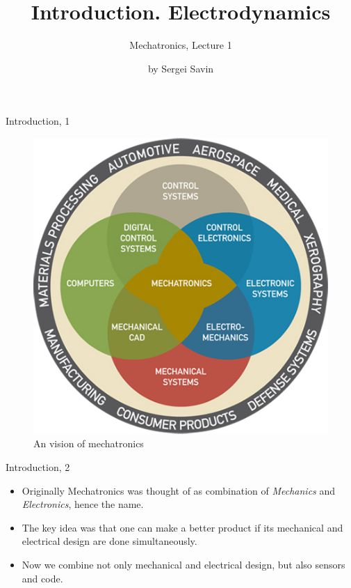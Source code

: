 \documentclass{beamer}
\title{Introduction. Electrodynamics}
\subtitle{Mechatronics, Lecture 1}
\author{by Sergei Savin}
\date{\mydate}
\begin{document}
\maketitle


\begin{frame}{Introduction, 1}
	\begin{flushleft}
		
		\begin{figure}
			\centering
			\includegraphics[width=0.7\linewidth]{mems_deiagram}
			\caption{An vision of mechatronics}
			\label{fig:memsdeiagram}
		\end{figure}
		
		
	\end{flushleft}
\end{frame}



\begin{frame}{Introduction, 2}
	\begin{flushleft}
		
\begin{itemize}
	\item Originally Mechatronics was thought of as combination of \emph{Mechanics} and \emph{Electronics}, hence the name.
	
	\item The key idea was that one can make a better product if its mechanical and electrical design are done simultaneously.
	
	\item Now we combine not only mechanical and electrical design, but also sensors and code.
\end{itemize}		
		
	\end{flushleft}
\end{frame}
\end{document}
